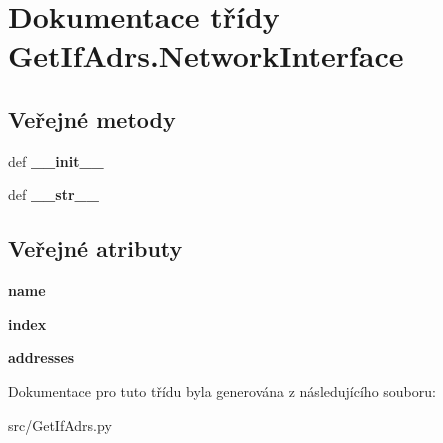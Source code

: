 \hypertarget{classGetIfAdrs_1_1NetworkInterface}{\section{Dokumentace třídy Get\-If\-Adrs.\-Network\-Interface}
\label{de/dfb/classGetIfAdrs_1_1NetworkInterface}
}
\subsection*{Veřejné metody}
\begin{DoxyCompactItemize}
\item 
\hypertarget{classGetIfAdrs_1_1NetworkInterface_a17045f163f7ea32f84f071a8fe4dc3da}{def {\bfseries \-\_\-\-\_\-init\-\_\-\-\_\-}}\label{de/dfb/classGetIfAdrs_1_1NetworkInterface_a17045f163f7ea32f84f071a8fe4dc3da}

\item 
\hypertarget{classGetIfAdrs_1_1NetworkInterface_af59ddf271fff23f70f0c12c0b7d238f7}{def {\bfseries \-\_\-\-\_\-str\-\_\-\-\_\-}}\label{de/dfb/classGetIfAdrs_1_1NetworkInterface_af59ddf271fff23f70f0c12c0b7d238f7}

\end{DoxyCompactItemize}
\subsection*{Veřejné atributy}
\begin{DoxyCompactItemize}
\item 
\hypertarget{classGetIfAdrs_1_1NetworkInterface_a2fa8fcd730a3938dd975fa9813d42a52}{{\bfseries name}}\label{de/dfb/classGetIfAdrs_1_1NetworkInterface_a2fa8fcd730a3938dd975fa9813d42a52}

\item 
\hypertarget{classGetIfAdrs_1_1NetworkInterface_a8985b52d915325de89e92b00b4110cd8}{{\bfseries index}}\label{de/dfb/classGetIfAdrs_1_1NetworkInterface_a8985b52d915325de89e92b00b4110cd8}

\item 
\hypertarget{classGetIfAdrs_1_1NetworkInterface_a2977c15005219565e7ace281fce740e5}{{\bfseries addresses}}\label{de/dfb/classGetIfAdrs_1_1NetworkInterface_a2977c15005219565e7ace281fce740e5}

\end{DoxyCompactItemize}


Dokumentace pro tuto třídu byla generována z následujícího souboru\-:\begin{DoxyCompactItemize}
\item 
src/Get\-If\-Adrs.\-py\end{DoxyCompactItemize}
